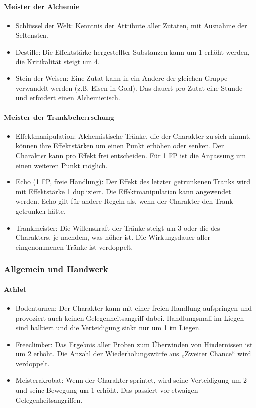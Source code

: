 \documentclass{article}
\begin{document}
\paragraph{Meister der Alchemie}

\begin{itemize}
\item Schlüssel der Welt: Kenntnis der Attribute aller Zutaten, mit Ausnahme der Seltensten.
\item Destille: Die Effektstärke hergestellter Substanzen kann um 1 erhöht werden, die Kritikalität steigt um 4.
\item Stein der Weisen: Eine Zutat kann in ein Andere der gleichen Gruppe verwandelt werden (z.B. Eisen in Gold). Das dauert pro Zutat eine Stunde und erfordert einen Alchemietisch.
\end{itemize}

\paragraph{Meister der Trankbeherrschung}

\begin{itemize}
\item Effektmanipulation: Alchemistische Tränke, die der Charakter zu sich nimmt, können ihre Effektstärken um einen Punkt erhöhen oder senken. Der Charakter kann pro Effekt frei entscheiden. Für 1 FP ist die Anpassung um einen weiteren Punkt möglich.
\item Echo (1 FP, freie Handlung): Der Effekt des letzten getrunkenen Tranks wird mit Effektstärke 1 dupliziert. Die Effektmanipulation kann angewendet werden. Echo gilt für andere Regeln als, wenn der Charakter den Trank getrunken hätte.
\item Trankmeister: Die Willenskraft der Tränke steigt um 3 oder die des Charakters, je nachdem, was höher ist. Die Wirkungsdauer aller eingenommenen Tränke ist verdoppelt.
\end{itemize}

\subsubsection{Allgemein und Handwerk}

\paragraph{Athlet}

\begin{itemize}
\item Bodenturnen: Der Charakter kann mit einer freien Handlung aufspringen und provoziert auch keinen Gelegenheitsangriff dabei. Handlungsmali im Liegen sind halbiert und die Verteidigung sinkt nur um 1 im Liegen.
\item Freeclimber: Das Ergebnis aller Proben zum Überwinden von Hindernissen ist um 2 erhöht. Die Anzahl der Wiederholungswürfe aus „Zweiter Chance“ wird verdoppelt.
\item Meisterakrobat: Wenn der Charakter sprintet, wird seine Verteidigung um 2 und seine Bewegung um 1 erhöht. Das passiert vor etwaigen Gelegenheitsangriffen.
\end{itemize}
\end{document}
